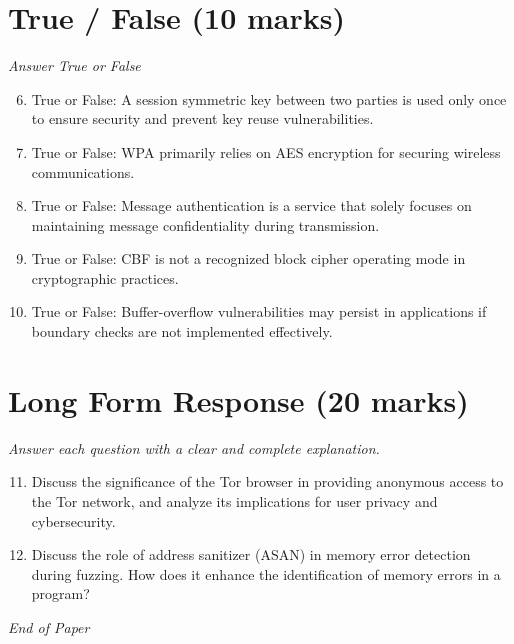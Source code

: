 \documentclass[12pt]{article}
\begin{document}
\section*{True / False (10 marks)}
\textit{Answer True or False}
\begin{enumerate}[label=\arabic*.]
\setcounter{enumi}{5}
\item True or False: A session symmetric key between two parties is used only once to ensure security and prevent key reuse vulnerabilities.
\item True or False: WPA primarily relies on AES encryption for securing wireless communications.
\item True or False: Message authentication is a service that solely focuses on maintaining message confidentiality during transmission.
\item True or False: CBF is not a recognized block cipher operating mode in cryptographic practices.
\item True or False: Buffer-overflow vulnerabilities may persist in applications if boundary checks are not implemented effectively.
\end{enumerate}

\section*{Long Form Response (20 marks)}
\textit{Answer each question with a clear and complete explanation.}
\begin{enumerate}[label=\arabic*.]
\setcounter{enumi}{10}
\item Discuss the significance of the Tor browser in providing anonymous access to the Tor network, and analyze its implications for user privacy and cybersecurity.
\item Discuss the role of address sanitizer (ASAN) in memory error detection during fuzzing. How does it enhance the identification of memory errors in a program?
\end{enumerate}

\vfill
\noindent\textit{End of Paper}
\end{document}
